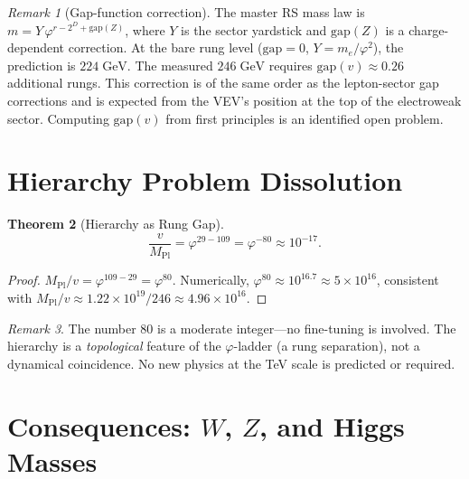 \documentclass[12pt,a4paper]{article}
\newtheorem{theorem}{Theorem}[section]
\theoremstyle{definition}
\theoremstyle{remark}
\newtheorem{remark}[theorem]{Remark}
\begin{document}
\begin{remark}[Gap-function correction]
\label{rem:gap}
The master RS mass law is $m = Y\,\varphi^{r - 2^D + \mathrm{gap}(Z)}$,
where $Y$ is the sector yardstick and $\mathrm{gap}(Z)$ is a
charge-dependent correction.  At the bare rung level ($\mathrm{gap} = 0$,
$Y = m_e/\varphi^2$), the prediction is $224\;\mathrm{GeV}$.  The
measured $246\;\mathrm{GeV}$ requires $\mathrm{gap}(v) \approx 0.26$
additional rungs.  This correction is of the same order as the lepton-sector
gap corrections and is expected from the VEV's position at the top of the
electroweak sector.  Computing $\mathrm{gap}(v)$ from first principles
is an identified open problem.
\end{remark}

\section{Hierarchy Problem Dissolution}
\label{sec:hierarchy}

\begin{theorem}[Hierarchy as Rung Gap]
\label{thm:hierarchy}
\begin{equation}
  \boxed{\frac{v}{M_{\mathrm{Pl}}} = \varphi^{29 - 109}
  = \varphi^{-80} \approx 10^{-17}.}
\end{equation}
\end{theorem}

\begin{proof}
$M_{\mathrm{Pl}}/v = \varphi^{109 - 29} = \varphi^{80}$.
Numerically, $\varphi^{80} \approx 10^{16.7} \approx
5 \times 10^{16}$, consistent with
$M_{\mathrm{Pl}}/v \approx 1.22 \times 10^{19}/246 \approx
4.96 \times 10^{16}$.
\end{proof}

\begin{remark}
The number 80 is a moderate integer---no fine-tuning is involved.
The hierarchy is a \emph{topological} feature of the
$\varphi$-ladder (a rung separation), not a dynamical coincidence.
No new physics at the TeV scale is predicted or required.
\end{remark}

\section{Consequences: $W$, $Z$, and Higgs Masses}
\label{sec:consequences}
\end{document}
